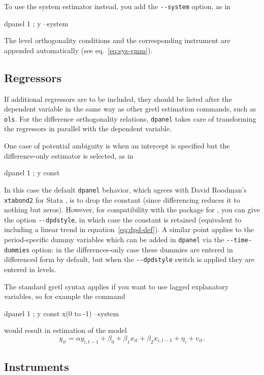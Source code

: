 To use the system estimator instead, you add the \verb|--system|
option, as in
\begin{code}
  dpanel 1 ; y --system
\end{code}
The level orthogonality conditions and the corresponding instrument
are appended automatically (see eq.\ \ref{eq:sys-gmm}).

\subsection{Regressors}

If additional regressors are to be included, they should be listed
after the dependent variable in the same way as other gretl estimation
commands, such as \texttt{ols}.  For the difference orthogonality
relations, \texttt{dpanel} takes care of transforming the regressors
in parallel with the dependent variable.

One case of potential ambiguity is when an intercept is specified but
the difference-only estimator is selected, as in
\begin{code}
  dpanel 1 ; y const
\end{code}
In this case the default \texttt{dpanel} behavior, which agrees with
David Roodman's \texttt{xtabond2} for Stata \citep{Roodman2009}, is to
drop the constant (since differencing reduces it to nothing but
zeros). However, for compatibility with the  package for
, you can give the option \verb|--dpdstyle|, in which case the
constant is retained (equivalent to including a linear trend in
equation~\ref{eq:dpd-def}).  A similar point applies to the
period-specific dummy variables which can be added in \texttt{dpanel}
via the \verb|--time-dummies| option: in the differences-only case
these dummies are entered in differenced form by default, but when the
\verb|--dpdstyle| switch is applied they are entered in levels.

The standard gretl syntax applies if you want to use lagged
explanatory variables, so for example the command
\begin{code}
  dpanel 1 ; y const x(0 to -1) --system
\end{code}
would result in estimation of the model
\[
  y_{it} = \alpha y_{i,t-1} + 
  \beta_0 + \beta_1 x_{it} + \beta_2 x_{i,t-1} +
  \eta_{i} + v_{it} .
\]

\subsection{Instruments}

